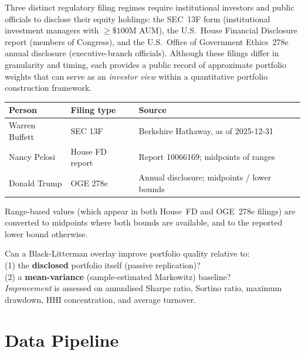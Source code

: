 \documentclass[11pt, a4paper]{article}
\begin{document}
Three distinct regulatory filing regimes require institutional investors and
public officials to disclose their equity holdings: the SEC~13F form
(institutional investment managers with $\geq\$100$M AUM), the U.S.\ House
Financial Disclosure report (members of Congress), and the U.S.\ Office of
Government Ethics~278e annual disclosure (executive-branch officials).
Although these filings differ in granularity and timing, each provides a
public record of approximate portfolio weights that can serve as an
\emph{investor view} within a quantitative portfolio construction framework.

\medskip
\begin{center}
\begin{tabular}{@{}lll@{}}
  \toprule
  \textbf{Person} & \textbf{Filing type} & \textbf{Source} \\
  \midrule
  Warren Buffett  & SEC 13F               & Berkshire Hathaway, as of 2025-12-31 \\
  Nancy Pelosi    & House FD report       & Report 10066169; midpoints of ranges \\
  Donald Trump    & OGE 278e              & Annual disclosure; midpoints / lower bounds \\
  \bottomrule
\end{tabular}
\end{center}
\medskip

Range-based values (which appear in both House~FD and OGE~278e filings) are
converted to midpoints where both bounds are available, and to the reported
lower bound otherwise.

\begin{researchbox}
  Can a Black-Litterman overlay improve portfolio quality relative to:\\[4pt]
  \quad (1) the \textbf{disclosed} portfolio itself (passive replication)?\\[2pt]
  \quad (2) a \textbf{mean-variance} (sample-estimated Markowitz) baseline?\\[6pt]
  \textit{Improvement} is assessed on annualised Sharpe ratio, Sortino ratio,
  maximum drawdown, HHI concentration, and average turnover.
\end{researchbox}

\section{Data Pipeline}
\end{document}
